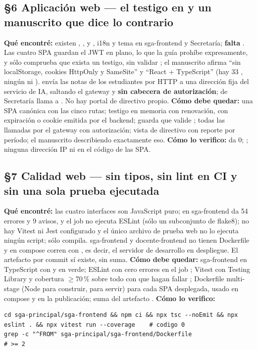 \subsection*{\S6 Aplicaci\'on web --- el testigo en  y un manuscrito que dice lo contrario}
\textbf{Qu\'e encontr\'e:} existen \rt{/}, ,  y , i18n y tema en sga-frontend y Secretar\'ia; \textbf{falta }. Las cuatro SPA guardan el JWT en  plano, lo que la gu\'ia proh\'ibe expresamente, y  s\'olo comprueba que exista un testigo, sin validar ; el manuscrito afirma ``sin localStorage, cookies HttpOnly y SameSite'' y ``React + TypeScript'' (hay 33 , ning\'un  ni ).  env\'ia las notas de los estudiantes por HTTP a una direcci\'on fija del servicio de IA, saltando el gateway y \textbf{sin cabecera de autorizaci\'on};  de Secretar\'ia llama a . No hay portal de directivo propio. \textbf{C\'omo debe quedar:} una SPA can\'onica con las cinco rutas; testigo en memoria con renovaci\'on,  con expiraci\'on o cookie  emitida por el backend; guarda que valide ; todas las llamadas por el gateway con autorizaci\'on; vista de directivo con reporte por per\'iodo; el manuscrito describiendo exactamente eso. \textbf{C\'omo lo verifico:}  da 0; ; ninguna direcci\'on IP ni  en el c\'odigo de las SPA.

\subsection*{\S7 Calidad web --- sin tipos, sin lint en CI y sin una sola prueba ejecutada}
\textbf{Qu\'e encontr\'e:} las cuatro interfaces son JavaScript puro;  en sga-frontend da 54 errores y 9 avisos, y el job  no ejecuta ESLint (s\'olo un subconjunto de flake8); no hay Vitest ni Jest configurado y el \'unico archivo de prueba web no lo ejecuta ning\'un script;  s\'olo compila. sga-frontend y docente-frontend no tienen Dockerfile y en compose corren con , es decir, el servidor de desarrollo en despliegue. El artefacto  por commit s\'i existe, sin suma. \textbf{C\'omo debe quedar:} sga-frontend en TypeScript con  y  en verde; ESLint con cero errores en el job ; Vitest con Testing Library y cobertura $\ge$70\,\% sobre todo  con  que hagan fallar ; Dockerfile multi-stage (Node para construir,  para servir) para cada SPA desplegada, usado en compose y en la publicaci\'on; suma del artefacto . \textbf{C\'omo lo verifico:}\begin{verbatim}
cd sga-principal/sga-frontend && npm ci && npx tsc --noEmit && npx eslint . && npx vitest run --coverage    # codigo 0
grep -c "^FROM" sga-principal/sga-frontend/Dockerfile                                                        # >= 2
\end{verbatim}

